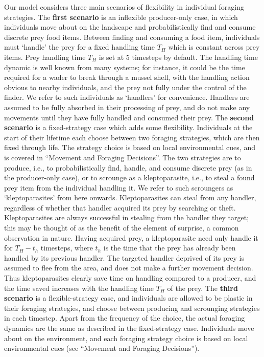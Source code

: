 \documentclass[11pt]{article}
\begin{document}
Our model considers three main scenarios of flexibility in individual foraging strategies.
The \textbf{first scenario} is an inflexible producer-only case, in which individuals move about on the landscape and probabilistically find and consume discrete prey food items.
Between finding and consuming a food item, individuals must `handle' the prey for a fixed handling time $T_H$ which is constant across prey items.
Prey handling time $T_H$ is set at 5 timesteps by default.
The handling time dynamic is well known from many systems; for instance, it could be the time required for a wader to break through a mussel shell, with the handling action obvious to nearby individuals, and the prey not fully under the control of the finder.
We refer to such individuals as `handlers' for convenience.
Handlers are assumed to be fully absorbed in their processing of prey, and do not make any movements until they have fully handled and consumed their prey.
The \textbf{second scenario} is a fixed-strategy case which adds some flexibility.
Individuals at the start of their lifetime each choose between two foraging strategies, which are then fixed through life.
The strategy choice is based on local environmental cues, and is covered in ``Movement and Foraging Decisions''.
The two strategies are to produce, i.e., to probabilistically find, handle, and consume discrete prey (as in the producer-only case), or to scrounge as a kleptoparasite, i.e., to steal a found prey item from the individual handling it.
We refer to such scroungers as `kleptoparasites' from here onwards.
Kleptoparasites can steal from any handler, regardless of whether that handler acquired its prey by searching or theft.
Kleptoparasites are always successful in stealing from the handler they target; this may be thought of as the benefit of the element of surprise, a common observation in nature.
Having acquired prey, a kleptoparasite need only handle it for $T_H - t_h$ timesteps, where $t_h$ is the time that the prey has already been handled by its previous handler.
The targeted handler deprived of its prey is assumed to flee from the area, and does not make a further movement decision.
Thus kleptoparasites clearly save time on handling compared to a producer, and the time saved increases with the handling time $T_H$ of the prey.
The \textbf{third scenario} is a flexible-strategy case, and individuals are allowed to be plastic in their foraging strategies, and choose between producing and scrounging strategies in each timestep.
Apart from the frequency of the choice, the actual foraging dynamics are the same as described in the fixed-strategy case. Individuals move about on the environment, and each foraging strategy choice is based on local environmental cues (see ``Movement and Foraging Decisions'').
\end{document}
